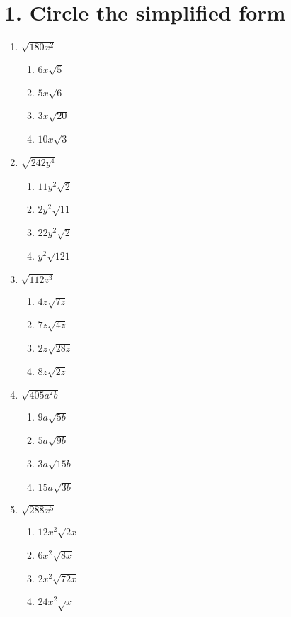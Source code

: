 \documentclass{hw}
\begin{document}
\section*{\normalsize 1. Circle the simplified form}
\begin{enumerate}[label=\alph*.]
    \item $\sqrt{180x^2}$
        \begin{enumerate}[label=\Alph*.]
            \item $6x\sqrt{5}$
            \item $5x\sqrt{6}$
            \item $3x\sqrt{20}$
            \item $10x\sqrt{3}$
        \end{enumerate}
    \item $\sqrt{242y^4}$
        \begin{enumerate}[label=\Alph*.]
            \item $11y^2\sqrt{2}$
            \item $2y^2\sqrt{11}$
            \item $22y^2\sqrt{2}$
            \item $y^2\sqrt{121}$
        \end{enumerate}
    \item $\sqrt{112z^3}$
        \begin{enumerate}[label=\Alph*.]
            \item $4z\sqrt{7z}$
            \item $7z\sqrt{4z}$
            \item $2z\sqrt{28z}$
            \item $8z\sqrt{2z}$
        \end{enumerate}
    \item $\sqrt{405a^2b}$
        \begin{enumerate}[label=\Alph*.]
            \item $9a\sqrt{5b}$
            \item $5a\sqrt{9b}$
            \item $3a\sqrt{15b}$
            \item $15a\sqrt{3b}$
        \end{enumerate}
    \item $\sqrt{288x^5}$
        \begin{enumerate}[label=\Alph*.]
            \item $12x^2\sqrt{2x}$
            \item $6x^2\sqrt{8x}$
            \item $2x^2\sqrt{72x}$
            \item $24x^2\sqrt{x}$
        \end{enumerate}
\end{enumerate}
\end{document}
